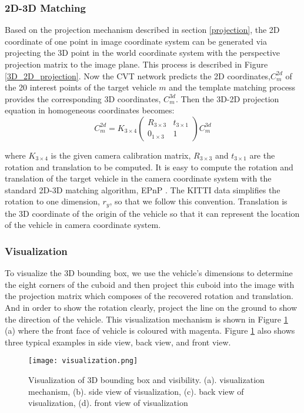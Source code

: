 \subsubsection{2D-3D Matching}

Based on the projection mechanism described in section \ref{projection}, the 2D coordinate of one point in image coordinate system can be generated via projecting the 3D point in the world coordinate system with the perspective projection matrix to the image plane. This process is described in Figure \ref{3D_2D_projection}. Now the CVT network predicts the 2D coordinates,$C_m^{2d}$ of the 20 interest points of the target vehicle $m$ and the template matching process provides the corresponding 3D coordinates, $C_m^{3d}$. Then the 3D-2D projection equation in homogeneous coordinates becomes:
\begin{equation}
	C_m^{2d} =   K_{3\times 4}
	\begin{pmatrix}
	R_{3\times 3} & t_{3\times 1}\\ 
	0_{1\times 3}& 1
	\end{pmatrix} C_m^{3d}
\end{equation}

where $K_{3\times 4}$ is the given camera calibration matrix, $R_{3\times 3}$ and $t_{3\times 1}$ are the rotation and translation to be computed. It is easy to compute the rotation and translation of the target vehicle in the camera coordinate system with the standard 2D-3D matching algorithm, EPnP \cite{Lepetit2008}. The KITTI data simplifies the rotation to one dimension, $r_y$, so that we follow this convention. Translation is the 3D coordinate of the origin of the vehicle so that it can represent the location of the vehicle in camera coordinate system.


\subsubsection{Visualization}
To visualize the 3D bounding box, we use the vehicle's dimensions to determine the eight corners of the cuboid and then project this cuboid into the image with the projection matrix which composes of the recovered rotation and translation. And in order to show the rotation clearly, project the line on the ground to show the direction of the vehicle. This visualization mechanism is shown in Figure \ref{figure:visualization} (a) where the front face of vehicle is coloured with magenta. Figure \ref{figure:visualization} also shows three typical examples in side view, back view, and front view.

\begin{figure}[h]		
	\texttt{[image: visualization.png]}
	\caption{Visualization of 3D bounding box and visibility. (a). visualization mechanism, (b). side view of visualization, (c). back view of visualization, (d). front view of visualization}
	\centering
	\label{figure:visualization}
\end{figure}





